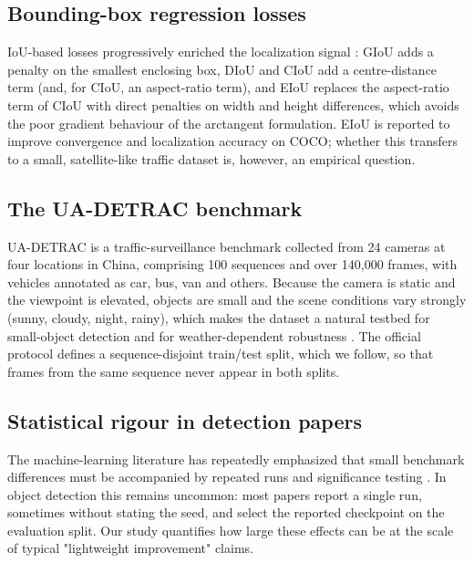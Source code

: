 \documentclass[pdflatex,sn-basic,Numbered]{sn-jnl}%
\begin{document}
\subsection{Bounding-box regression losses}

IoU-based losses progressively enriched the localization signal \cite{zhou2019iou}: GIoU \cite{rezatofighi2019giou} adds a penalty on the smallest enclosing box, DIoU and CIoU \cite{zheng2020diou} add a centre-distance term (and, for CIoU, an aspect-ratio term), and EIoU \cite{zhang2022eiou} replaces the aspect-ratio term of CIoU with direct penalties on width and height differences, which avoids the poor gradient behaviour of the arctangent formulation. EIoU is reported to improve convergence and localization accuracy on COCO; whether this transfers to a small, satellite-like traffic dataset is, however, an empirical question.

\subsection{The UA-DETRAC benchmark}

UA-DETRAC \cite{wen2020uadetrac} is a traffic-surveillance benchmark collected from 24 cameras at four locations in China, comprising 100 sequences and over 140{,}000 frames, with vehicles annotated as car, bus, van and others. Because the camera is static and the viewpoint is elevated, objects are small and the scene conditions vary strongly (sunny, cloudy, night, rainy), which makes the dataset a natural testbed for small-object detection and for weather-dependent robustness \cite{michaelis2019benchmarking,hendrycks2019benchmarking}. The official protocol defines a sequence-disjoint train/test split, which we follow, so that frames from the same sequence never appear in both splits.

\subsection{Statistical rigour in detection papers}

The machine-learning literature has repeatedly emphasized that small benchmark differences must be accompanied by repeated runs and significance testing \cite{dietterich1998tests,demsar2006statistical,beyer2020imagenet}. In object detection this remains uncommon: most papers report a single run, sometimes without stating the seed, and select the reported checkpoint on the evaluation split. Our study quantifies how large these effects can be at the scale of typical "lightweight improvement" claims.
\end{document}
